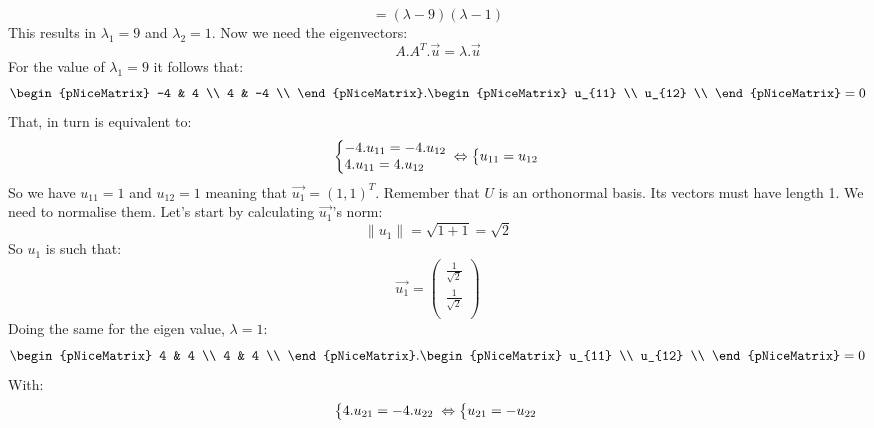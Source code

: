\documentclass[600paper, 11pt,twoside,openany]{kdp}
\begin{document}
\[ = (\lambda -9)(\lambda - 1)\]
\indent This results in $\lambda_1 = 9$ and $\lambda_2 = 1$. Now we need the eigenvectors:
\[A.A^T.\overrightarrow{u} = \lambda .\overrightarrow{u} \]
\indent For the value of $\lambda_1 = 9$ it follows that:
\[\begin{pNiceMatrix} 
-4 & 4 \\
4 & -4 \\
\end{pNiceMatrix} . \begin{pNiceMatrix} 
u_{11} \\
u_{12} \\
\end{pNiceMatrix} = 0
\]
\indent That, in turn is equivalent to:
\[
  \left\{\begin{array}{@{}l@{}}
   -4.u_{11} = -4.u_{12}\\
   4.u_{11} = 4.u_{12}
  \end{array}\right.\, 
  \Leftrightarrow
  \left\{\begin{array}{@{}l@{}}
   u_{11} = u_{12}
  \end{array}\right.\,
\]
\indent So we have $u_{11} = 1$ and $u_{12} = 1$ meaning that $\overrightarrow{u_1} = (1,1)^T$.
Remember that $U$ is an orthonormal basis. Its vectors must have length 1. We need to normalise them. Let's start by calculating $\overrightarrow{u_1}$'s norm:
\[\| u_1 \| = \sqrt{1 + 1} = \sqrt{2}\]
\indent So $u_1$ is such that:
\[\overrightarrow{u_1} = \begin{pmatrix}
\frac{1}{\sqrt{2}}\\
\frac{1}{\sqrt{2}}\\
\end{pmatrix}
\]
\indent Doing the same for the eigen value, $\lambda = 1$:
\[
\begin{pNiceMatrix} 
4 & 4 \\
4 & 4 \\
\end{pNiceMatrix} . \begin{pNiceMatrix} 
u_{11} \\
u_{12} \\
\end{pNiceMatrix} = 0
\]
\indent With:
\[  \left\{\begin{array}{@{}l@{}}
   4.u_{21} = -4.u_{22}\\
  \end{array}\right.\,
   \Leftrightarrow
  \left\{\begin{array}{@{}l@{}}
   u_{21} = -u_{22}
  \end{array}\right.\,
\]
\end{document}
